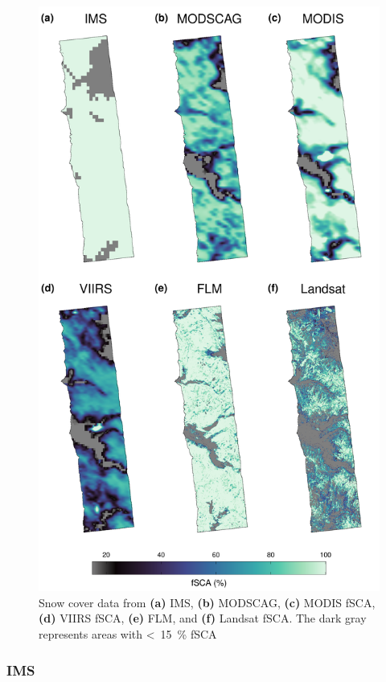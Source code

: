 \begin{figure}[h]
\includegraphics[width=13cm]{figures/ch4_figs/fsca_usvar_v2.pdf}
\caption{Snow cover data from \textbf{(a)} IMS, \textbf{(b)} MODSCAG, \textbf{(c)} MODIS fSCA, \textbf{(d)} VIIRS fSCA, \textbf{(e)} FLM, and \textbf{(f)} Landsat fSCA. The dark gray represents areas with <~15~\% fSCA}
\label{fig:fsca_plot}
\end{figure}

\clearpage
\hypertarget{ch4-methods-3}{\subsubsection{IMS}\label{ch4-methods-3}}

